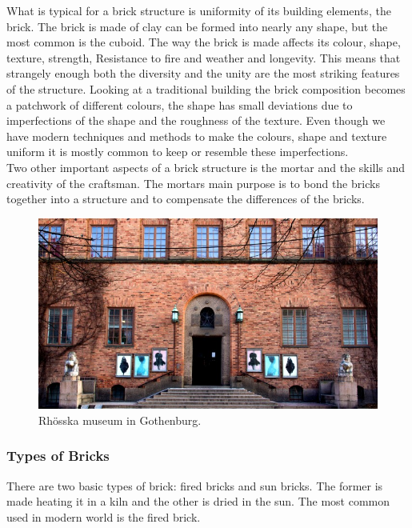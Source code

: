What is typical for a brick structure is uniformity of its building elements, the brick. The brick is made of clay can be formed into nearly any shape, but the most common is the cuboid. The way the brick is made affects its colour, shape, texture, strength, Resistance to fire and weather and longevity. This means that strangely enough both the diversity and the unity are the most striking features of the structure. Looking at a traditional building the brick composition becomes a patchwork of different colours, the shape has small deviations due to imperfections of the shape and the roughness of the texture. Even though we have modern techniques and methods to make the colours, shape and texture uniform it is mostly common to keep or resemble these imperfections.\\
Two other important aspects of a brick structure is the mortar and the skills and creativity of the craftsman. The mortars main purpose is to bond the bricks together into a structure and to compensate the differences of the bricks. 

\begin{figure}[H]
\centering
\includegraphics[width=1.0\linewidth ]{figure/Introduction/Rohsska.jpg}
\caption{Rhösska museum in Gothenburg.}
\end{figure}







\subsubsection{Types of Bricks}

There are two basic types of brick: fired bricks and sun bricks. The former is made heating it in a kiln and the other is dried in the sun. The most common used in modern world is the fired brick. 

